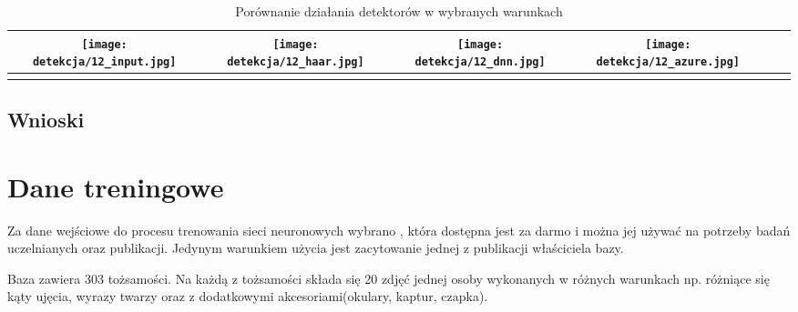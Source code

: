 \begin{longtable}{|c|c|c|c|c|c|}
\begin{minipage}{.2\textwidth}
      	\texttt{[image: detekcja/12\_input.jpg]}
    	\end{minipage}
		& 
		\begin{minipage}{.2\textwidth}
      	\texttt{[image: detekcja/12\_haar.jpg]}
    	\end{minipage}
		& 
		\begin{minipage}{.2\textwidth}
      	\texttt{[image: detekcja/12\_dnn.jpg]}
    	\end{minipage}
		& 
		\begin{minipage}{.2\textwidth}
      	\texttt{[image: detekcja/12\_azure.jpg]}
    	\end{minipage}	
    	\\
  		\hline 
\caption{Porównanie działania detektorów w wybranych warunkach}
\label{tab:porownanie_detektorow}
\end{longtable}

\begin{table}[H]\label{tab:systemy}
	\centering
	\caption{Średni czas przetwarzania zadania detekcji twarzy}
\end{table}

\subsection{Wnioski}

\section{Dane treningowe}
Za dane wejściowe do procesu trenowania sieci neuronowych wybrano , która dostępna jest za darmo i można jej używać na potrzeby badań uczelnianych oraz publikacji. Jedynym warunkiem użycia jest zacytowanie jednej z publikacji właściciela bazy.

Baza zawiera 303 tożsamości. Na każdą z tożsamości składa się 20 zdjęć jednej osoby wykonanych w różnych warunkach np. różniące się kąty ujęcia, wyrazy twarzy oraz z dodatkowymi akcesoriami(okulary, kaptur, czapka). 

